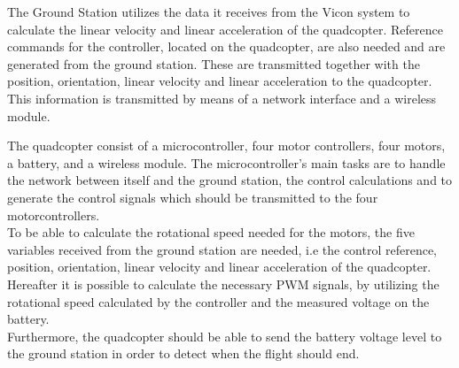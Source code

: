 The Ground Station utilizes the data it receives from the Vicon system to calculate the linear velocity and linear acceleration of the quadcopter. Reference commands for the controller, located on the quadcopter, are also needed and are generated from the ground station. These are transmitted together with the position, orientation, linear velocity and linear acceleration to the quadcopter. This information is transmitted by means of a network interface and a wireless module.

The quadcopter consist of a microcontroller, four motor controllers, four motors, a battery, and a wireless module. The microcontroller's main tasks are to handle the network between itself and the ground station, the control calculations and to generate the control signals which should be transmitted to the four motorcontrollers. \\To be able to calculate the rotational speed needed for the motors, the five variables received from the ground station are needed, i.e the control reference, position, orientation, linear velocity and linear acceleration of the quadcopter. Hereafter it is possible to calculate the necessary PWM signals, by utilizing the rotational speed calculated by the controller and the measured voltage on the battery. \\Furthermore, the quadcopter should be able to send the battery voltage level to the ground station in order to detect when the flight should end.





